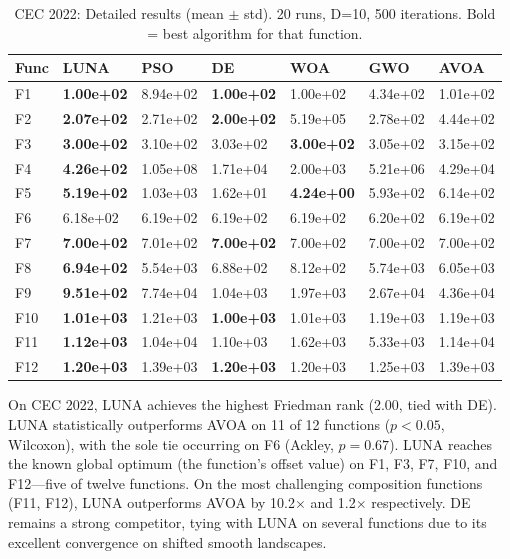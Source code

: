 \documentclass[11pt,a4paper]{article}
\begin{document}
\begin{table}[htbp]
\centering
\caption{CEC 2022: Detailed results (mean $\pm$ std). 20 runs, D=10, 500 iterations. Bold = best algorithm for that function.}
\label{tab:cec2022_detail}
\renewcommand{\arraystretch}{1.0}
\scriptsize
\begin{tabularx}{\textwidth}{@{}lYYYYYY@{}}
\toprule
\textbf{Func} & \textbf{LUNA} & \textbf{PSO} & \textbf{DE} & \textbf{WOA} & \textbf{GWO} & \textbf{AVOA} \\
\midrule
F1  & \textbf{1.00e+02} & 8.94e+02 & \textbf{1.00e+02} & 1.00e+02 & 4.34e+02 & 1.01e+02 \\
F2  & \textbf{2.07e+02} & 2.71e+02 & \textbf{2.00e+02} & 5.19e+05 & 2.78e+02 & 4.44e+02 \\
F3  & \textbf{3.00e+02} & 3.10e+02 & 3.03e+02 & \textbf{3.00e+02} & 3.05e+02 & 3.15e+02 \\
F4  & \textbf{4.26e+02} & 1.05e+08 & 1.71e+04 & 2.00e+03 & 5.21e+06 & 4.29e+04 \\
F5  & \textbf{5.19e+02} & 1.03e+03 & 1.62e+01 & \textbf{4.24e+00} & 5.93e+02 & 6.14e+02 \\
F6  & 6.18e+02 & 6.19e+02 & 6.19e+02 & 6.19e+02 & 6.20e+02 & 6.19e+02 \\
F7  & \textbf{7.00e+02} & 7.01e+02 & \textbf{7.00e+02} & 7.00e+02 & 7.00e+02 & 7.00e+02 \\
F8  & \textbf{6.94e+02} & 5.54e+03 & 6.88e+02 & 8.12e+02 & 5.74e+03 & 6.05e+03 \\
F9  & \textbf{9.51e+02} & 7.74e+04 & 1.04e+03 & 1.97e+03 & 2.67e+04 & 4.36e+04 \\
F10 & \textbf{1.01e+03} & 1.21e+03 & \textbf{1.00e+03} & 1.01e+03 & 1.19e+03 & 1.19e+03 \\
F11 & \textbf{1.12e+03} & 1.04e+04 & 1.10e+03 & 1.62e+03 & 5.33e+03 & 1.14e+04 \\
F12 & \textbf{1.20e+03} & 1.39e+03 & \textbf{1.20e+03} & 1.20e+03 & 1.25e+03 & 1.39e+03 \\
\bottomrule
\end{tabularx}
\end{table}

On CEC 2022, LUNA achieves the highest Friedman rank (2.00, tied with DE). LUNA statistically outperforms AVOA on 11 of 12 functions ($p < 0.05$, Wilcoxon), with the sole tie occurring on F6 (Ackley, $p=0.67$). LUNA reaches the known global optimum (the function's offset value) on F1, F3, F7, F10, and F12---five of twelve functions. On the most challenging composition functions (F11, F12), LUNA outperforms AVOA by 10.2$\times$ and 1.2$\times$ respectively. DE remains a strong competitor, tying with LUNA on several functions due to its excellent convergence on shifted smooth landscapes.
\end{document}
